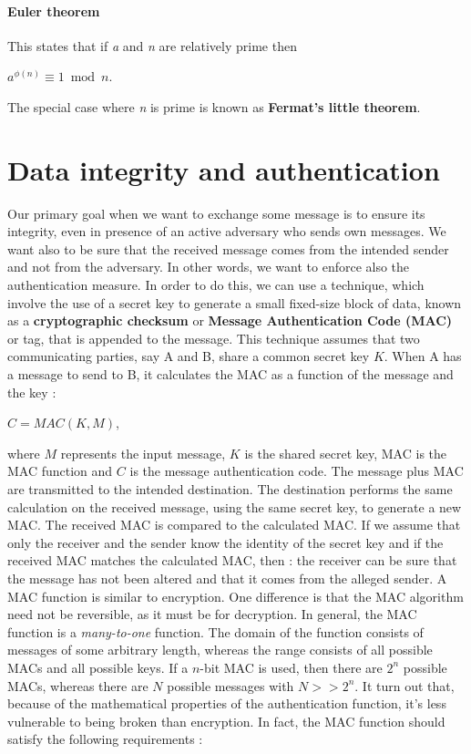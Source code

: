 \documentclass[11pt]{article}
\begin{document}
\paragraph{Euler theorem} This states that if \textit{a} and \textit{n} are relatively prime then 
\begin{center}
$a^{\phi(n)} \equiv 1 \bmod n$.
\end{center}
The special case where \textit{n} is prime is known as \textbf{Fermat's little theorem}.
\section{Data integrity and authentication}
Our primary goal when we want to exchange some message is to ensure its integrity, even in presence of an active adversary who sends own messages. We want also to be sure that the received message comes from the intended sender and not from the adversary. In other words, we want to enforce also the authentication measure. In order to do this, we can use a technique, which involve the use of a secret key to generate a small fixed-size block of data, known as a \textbf{cryptographic checksum} or \textbf{Message Authentication Code (MAC)} or tag, that is appended to the message. This technique assumes that two communicating parties, say A and B, share a common secret key $K$. When A has a message to send to B, it calculates the MAC as a function of the message and the key :
\begin{center}
$C = MAC(K, M)$,
\end{center}
where $M$ represents the input message, $K$ is the shared secret key, MAC is the MAC function and $C$ is the message authentication code. The message plus MAC are transmitted to the intended destination. The destination performs the same calculation on the received message, using the same secret key, to generate a new MAC. The received MAC is compared to the calculated MAC. If we assume that only the receiver and the sender know the identity of the secret key and if the received MAC matches the calculated MAC, then : the receiver can be sure that the message has not been altered and that it comes from the alleged sender. A MAC function is similar to encryption. One difference is that the MAC algorithm need not be reversible, as it must be for decryption. In general, the MAC function is a \textit{many-to-one} function. The domain of the function consists of messages of some arbitrary length, whereas the range consists of all possible MACs and all possible keys. If a $n$-bit MAC is used, then there are $2^n$ possible MACs, whereas there are $N$ possible messages with $N >> 2^n$. It turn out that, because of the mathematical properties of the authentication function, it's less vulnerable to being broken than encryption. In fact, the MAC function should satisfy the following requirements :
\end{document}
